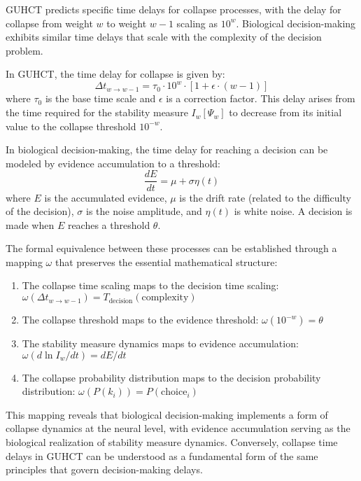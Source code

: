 \documentclass[11pt,a4paper]{article}
\makeatletter
\renewenvironment{proof}[1][\proofname]{\par
  \pushQED{\qed}%
  \normalfont \topsep6\p@\@plus6\p@\relax
  \trivlist
  \item[\hskip\labelsep
        \itshape
    #1\@addpunct{.}]\ignorespaces
}{%
  \popQED\endtrivlist\@endpefalse
}
\makeatother
\begin{document}
\begin{proof}
GUHCT predicts specific time delays for collapse processes, with the delay for collapse from weight $w$ to weight $w-1$ scaling as $10^w$. Biological decision-making exhibits similar time delays that scale with the complexity of the decision problem.

In GUHCT, the time delay for collapse is given by:
\begin{equation}
\Delta t_{w \to w-1} = \tau_0 \cdot 10^w \cdot [1 + \epsilon \cdot (w-1)]
\end{equation}
where $\tau_0$ is the base time scale and $\epsilon$ is a correction factor. This delay arises from the time required for the stability measure $I_w[\Psi_w]$ to decrease from its initial value to the collapse threshold $10^{-w}$.

In biological decision-making, the time delay for reaching a decision can be modeled by evidence accumulation to a threshold:
\begin{equation}
\frac{dE}{dt} = \mu + \sigma \eta(t)
\end{equation}
where $E$ is the accumulated evidence, $\mu$ is the drift rate (related to the difficulty of the decision), $\sigma$ is the noise amplitude, and $\eta(t)$ is white noise. A decision is made when $E$ reaches a threshold $\theta$.

The formal equivalence between these processes can be established through a mapping $\omega$ that preserves the essential mathematical structure:
\begin{enumerate}
    \item The collapse time scaling maps to the decision time scaling: $\omega(\Delta t_{w \to w-1}) = T_{\text{decision}}(\text{complexity})$
    \item The collapse threshold maps to the evidence threshold: $\omega(10^{-w}) = \theta$
    \item The stability measure dynamics maps to evidence accumulation: $\omega(d\ln I_w / dt) = dE/dt$
    \item The collapse probability distribution maps to the decision probability distribution: $\omega(P(k_i)) = P(\text{choice}_i)$
\end{enumerate}

This mapping reveals that biological decision-making implements a form of collapse dynamics at the neural level, with evidence accumulation serving as the biological realization of stability measure dynamics. Conversely, collapse time delays in GUHCT can be understood as a fundamental form of the same principles that govern decision-making delays.


\end{proof}
\end{document}
